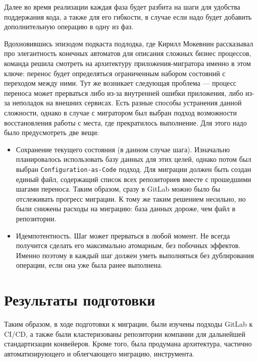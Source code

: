 Далее во время реализации каждая фаза будет разбита на шаги для удобства поддержания кода, а также для его гибкости,
в случае если надо будет добавить дополнительную операцию в одну из фаз.

Вдохновившись эпизодом\cite{podlodka-podcast} подкаста подлодка,
где Кирилл Мокевнин рассказывал про элегантность конечных автоматов\cite{fsm} для описания сложных бизнес процессов,
команда решила смотреть на архитектуру приложения-мигратора именно в этом ключе:
перенос будет определяться ограниченным набором состояний с переходом между ними.
Тут же возникает следующая проблема — процесс переноса может прерваться либо из-за внутренней ошибки приложения, либо из-за неполадок на внешних сервисах.
Есть разные способы устранения данной сложности, однако в случае с мигратором был выбран подход возможности восстановления работы с места, где прекратилось выполнение.
Для этого надо было предусмотреть две вещи:
\begin{itemize}
  \item Сохранение текущего состояния (в данном случае шага).
        Изначально планировалось использовать базу данных для этих целей, однако потом был выбран \texttt{Configuration-as-Code} подход\cite{cac}.
        Для миграции должен быть создан единый файл, содержащий список всех репозиториев вместе с прошедшими шагами переноса.
        Таким образом, сразу в GitLab можно было бы отслеживать прогресс миграции.
        К тому же таким решением несильно, но были снижены расходы на миграцию: база данных дороже, чем файл в репозитории.
  \item Идемпотентность\cite{idempotence}.
        Шаг может прерваться в любой момент.
        Не всегда получится сделать его максимально атомарным, без побочных эффектов.
        Именно поэтому в каждый шаг должен уметь выполняться без дублирования операции, если она уже была ранее выполнена.
\end{itemize}

\section{Результаты подготовки} \label{sec:preparation-result}
Таким образом, в ходе подготовки к миграции, были изучены подходы GitLab к CI/CD,
а также были кластеризованы репозитории компании для дальнейшей стандартизации конвейеров.
Кроме того, была продумана архитектура, частично автоматизирующего и облегчающего миграцию, инструмента.
